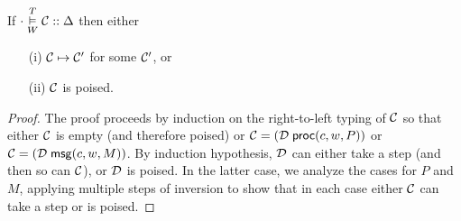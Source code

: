 \begin{theorem}
\label{thm:progress}
\mbox{}
If $\cdot \overset{T}{\underset{W}{\vDash}} \mathcal{C} :: \Delta$ then either
\begin{enumerate}
\item[(i)] $\mathcal{C} \mapsto \mathcal{C}'$ for some $\mathcal{C}'$, or
\item[(ii)] $\mathcal{C}$ is poised.
\end{enumerate}
\end{theorem}
\begin{proof}
The proof proceeds by induction on the right-to-left typing of $\mathcal{C}$ so that either
$\mathcal{C}$ is empty (and therefore poised) or
$\mathcal{C} = (\mathcal{D}\; \mathsf{proc}(c, w, P))$ or
$\mathcal{C} = (\mathcal{D}\; \mathsf{msg}(c, w, M))$. By induction hypothesis, $\mathcal{D}$ can
either take a step (and then so can $\mathcal{C}$), or $\mathcal{D}$ is poised.  In
the latter case, we analyze the cases for $P$ and $M$, applying multiple steps of
inversion to show that in each
case either $\mathcal{C}$ can take a step or is poised.
\end{proof}


